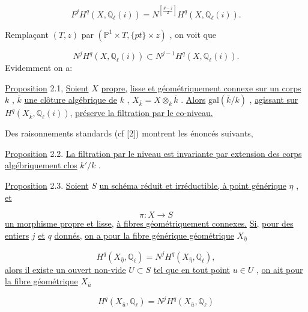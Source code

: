 \begin{equation}\tag{2.0.8}
F^j H^q(X, \mathbb{Q}_\ell(i)) = N^{\left[\frac{g-j}{2}\right]} H^q(X, \mathbb{Q}_\ell(i)) .
\end{equation}


Remplaçant  $(T, z)$  par  $(\mathbb{P}^1 \times T, \{pt\} \times z)$  , on voit que

\begin{equation}\tag{2.0.9}
N^j H^q(X, \mathbb{Q}_\ell(i)) \subset N^{j-1}H^q(X, \mathbb{Q}_\ell(i)) .
\end{equation}
Evidemment on a:

\underline{Proposition} 2.1,   \underline{Soient}  $X$  \underline{propre,} \underline{lisse et géométriquement connexe sur un corps}  $k$ ,  $\bar{k}$  \underline{une clôture algébrique de}  $k$ ,  $X_{\bar{k}} = X \otimes_k \bar{k}$  .  \underline{Alors}  $\mathrm{gal}(\bar{k}/k)$  , \underline{agissant sur}  $H^q(X_{\bar{k}}, \mathbb{Q}_\ell(i))$, \underline{préserve la filtration par le co-niveau.}

Des raisonnements standards (cf [2]) montrent les énoncés suivants,

\underline{Proposition} 2.2.  \underline{La filtration par le niveau est invariante par extension des corps algébriquement clos}  $k'/k$  .

\underline{Proposition} 2.3.   \underline{Soient}  $S$  \underline{un schéma réduit et irréductible, à point générique}  $\eta$  , \underline{et}

\begin{equation*}
\pi : X \longrightarrow S
\end{equation*}
\underline{un morphisme propre et lisse,} \underline{à fibres géométriquement connexes.} \underline{Si,} \underline{pour des entiers}  $j$  \underline{et}  $q$  \underline{donnés,} \underline{on a pour la fibre générique géométrique}  $X_{\bar{\eta}}$

\begin{equation}\tag{2.3.1}
H^q(X_{\bar{\eta}}, \mathbb{Q}_\ell) = N^j H^q(X_{\bar{\eta}}, \mathbb{Q}_\ell) ,
\end{equation}
\underline{alors il existe un ouvert non-vide}  $U \subset S$  \underline{tel que en tout point}  $u \in U$  , \underline{on ait pour la fibre géométrique}  $X_{\bar{u}}$

\begin{equation}\tag{2.3.2}
H^q(X_{\bar{u}}, \mathbb{Q}_\ell) = N^j H^q(X_{\bar{u}}, \mathbb{Q}_\ell)
\end{equation}


